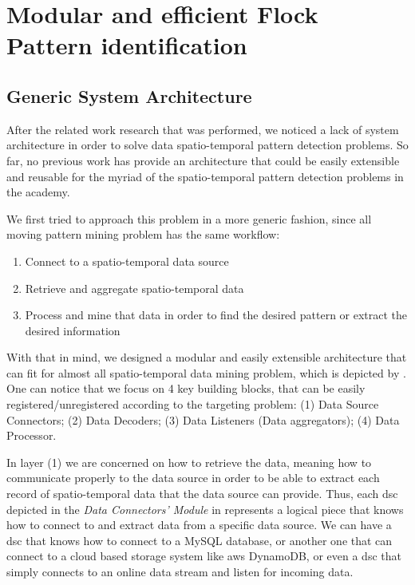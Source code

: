 \chapter{Modular and efficient Flock Pattern identification}
\label{chp:solution}
\section{Generic System Architecture}
\label{sec:architecture}
After the related work research that was performed, we noticed a lack of system architecture in order to solve data
spatio-temporal pattern detection problems. So far, no previous work has provide an architecture that could be easily
extensible and reusable for the myriad of the spatio-temporal pattern detection problems in the academy.

We first tried to approach this problem in a more generic fashion, since all moving pattern mining problem has the same
workflow:

\begin{enumerate}
    \item Connect to a spatio-temporal data source
    \item Retrieve and aggregate spatio-temporal data
    \item Process and mine that data in order to find the desired pattern or extract the desired information
\end{enumerate}

With that in mind, we designed a modular and easily extensible architecture that can fit for almost all spatio-temporal
data mining problem, which is depicted by . One can notice that we focus on 4 key building
blocks, that can be easily registered/unregistered according to the targeting problem: (1) Data Source Connectors; (2)
Data Decoders; (3) Data Listeners (Data aggregators); (4) Data Processor.

In layer (1) we are concerned on how to retrieve the data, meaning how to communicate properly to the data source in
order to be able to extract each record of spatio-temporal data that the data source can provide. Thus, each \ac{dsc}
depicted in the \textit{Data Connectors' Module} in  represents a logical piece that knows how
to connect to and extract data from a specific data source. We can have a \ac{dsc} that knows how to connect to a MySQL
database, or another one that can connect to a cloud based storage system like \ac{aws} DynamoDB, or even a \ac{dsc}
that simply connects to an online data stream and listen for incoming data.

